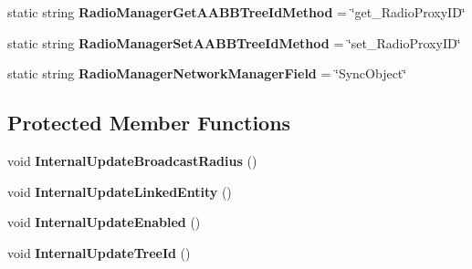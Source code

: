 \begin{DoxyCompactItemize}
\item 
\hypertarget{class_s_e_mod_a_p_i_internal_1_1_a_p_i_1_1_common_1_1_radio_manager_a597df7c191a7b91c684c1b7f18081e06}{}static string {\bfseries Radio\+Manager\+Get\+A\+A\+B\+B\+Tree\+Id\+Method} = \char`\"{}get\+\_\+\+Radio\+Proxy\+I\+D\char`\"{}\label{class_s_e_mod_a_p_i_internal_1_1_a_p_i_1_1_common_1_1_radio_manager_a597df7c191a7b91c684c1b7f18081e06}

\item 
\hypertarget{class_s_e_mod_a_p_i_internal_1_1_a_p_i_1_1_common_1_1_radio_manager_a2b04beb4f6f338dbd9f5f225f59b97dd}{}static string {\bfseries Radio\+Manager\+Set\+A\+A\+B\+B\+Tree\+Id\+Method} = \char`\"{}set\+\_\+\+Radio\+Proxy\+I\+D\char`\"{}\label{class_s_e_mod_a_p_i_internal_1_1_a_p_i_1_1_common_1_1_radio_manager_a2b04beb4f6f338dbd9f5f225f59b97dd}

\item 
\hypertarget{class_s_e_mod_a_p_i_internal_1_1_a_p_i_1_1_common_1_1_radio_manager_abcf5217f0a26a4ab4893fefc6a8153ad}{}static string {\bfseries Radio\+Manager\+Network\+Manager\+Field} = \char`\"{}Sync\+Object\char`\"{}\label{class_s_e_mod_a_p_i_internal_1_1_a_p_i_1_1_common_1_1_radio_manager_abcf5217f0a26a4ab4893fefc6a8153ad}

\end{DoxyCompactItemize}
\subsection*{Protected Member Functions}
\begin{DoxyCompactItemize}
\item 
\hypertarget{class_s_e_mod_a_p_i_internal_1_1_a_p_i_1_1_common_1_1_radio_manager_aac96079813cdb59ae4fc8f72ddab5784}{}void {\bfseries Internal\+Update\+Broadcast\+Radius} ()\label{class_s_e_mod_a_p_i_internal_1_1_a_p_i_1_1_common_1_1_radio_manager_aac96079813cdb59ae4fc8f72ddab5784}

\item 
\hypertarget{class_s_e_mod_a_p_i_internal_1_1_a_p_i_1_1_common_1_1_radio_manager_a1619704d98f1acecd5e920b34280ec1b}{}void {\bfseries Internal\+Update\+Linked\+Entity} ()\label{class_s_e_mod_a_p_i_internal_1_1_a_p_i_1_1_common_1_1_radio_manager_a1619704d98f1acecd5e920b34280ec1b}

\item 
\hypertarget{class_s_e_mod_a_p_i_internal_1_1_a_p_i_1_1_common_1_1_radio_manager_a9299b06d6077b7f7ff8d0ed15a509261}{}void {\bfseries Internal\+Update\+Enabled} ()\label{class_s_e_mod_a_p_i_internal_1_1_a_p_i_1_1_common_1_1_radio_manager_a9299b06d6077b7f7ff8d0ed15a509261}

\item 
\hypertarget{class_s_e_mod_a_p_i_internal_1_1_a_p_i_1_1_common_1_1_radio_manager_a33908f36ff4db142b32130d1479f6b80}{}void {\bfseries Internal\+Update\+Tree\+Id} ()\label{class_s_e_mod_a_p_i_internal_1_1_a_p_i_1_1_common_1_1_radio_manager_a33908f36ff4db142b32130d1479f6b80}

\end{DoxyCompactItemize}
